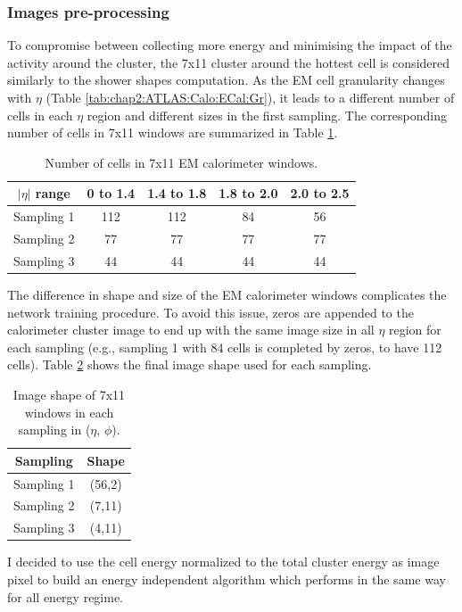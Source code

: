 \subsubsection{Images pre-processing}
\label{gamma:CNN:PreProcessing}
To compromise between collecting more energy and  minimising the impact of the activity around the cluster, the 7x11 cluster around the hottest cell is considered similarly to the shower shapes computation. As the EM cell granularity changes with $\eta$ (Table \ref{tab:chap2:ATLAS:Calo:ECal:Gr}), it leads to a different number of cells in each $\eta$ region and different sizes in the first sampling. The corresponding number of cells in 7x11 windows are summarized in Table \ref{tab:gamma:CNN:PreProcessing:NCells}.
\begin{table}[htbp]
    \centering
    \begin{tabular}{ccccc}
    \hline
        $|\eta|$ range & 0 to 1.4 & 1.4 to 1.8 & 1.8 to 2.0 & 2.0 to 2.5 \\
    \hline
        Sampling 1 & 112 & 112 & 84 & 56 \\
        Sampling 2 & 77 & 77 & 77 & 77 \\
        Sampling 3 & 44 & 44 & 44 & 44 \\
    \hline
    \end{tabular}
    \caption{Number of cells in 7x11 EM calorimeter windows.}
    \label{tab:gamma:CNN:PreProcessing:NCells}
\end{table}
The difference in shape and size of the EM calorimeter windows complicates the network training procedure. To avoid this issue, zeros are appended to the calorimeter cluster image to end up with the same image size in all $\eta$ region for each sampling (e.g., sampling 1 with 84 cells is completed by zeros, to have 112 cells). Table \ref{tab:gamma:CNN:PreProcessing:ImgSize} shows the final image shape used for each sampling.
\begin{table}[htbp]
    \centering
    \begin{tabular}{cc}
    \hline
        Sampling & Shape \\
    \hline
        Sampling 1 & (56,2)\\
        Sampling 2 & (7,11)  \\
        Sampling 3 & (4,11) \\
    \hline
    \end{tabular}
    \caption{Image shape of 7x11 windows in each sampling in ($\eta$, $\phi$).}
    \label{tab:gamma:CNN:PreProcessing:ImgSize}
\end{table}
I decided to use the cell energy normalized to the total cluster energy as image pixel to build an energy independent algorithm which performs in the same way for all energy regime.


